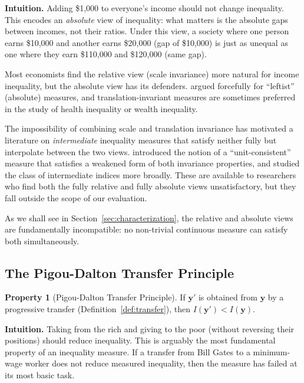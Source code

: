\documentclass[12pt]{article}
\theoremstyle{plain}
\theoremstyle{definition}
\newtheorem{axiom}{Property}
\theoremstyle{remark}
\newcommand{\bfy}{\mathbf{y}}
\begin{document}
\textbf{Intuition.}
Adding \$1{,}000 to everyone's income should not change inequality.
This encodes an \emph{absolute} view of inequality: what matters is the absolute gaps between incomes, not their ratios.
Under this view, a society where one person earns \$10{,}000 and another earns \$20{,}000 (gap of \$10{,}000) is just as unequal as one where they earn \$110{,}000 and \$120{,}000 (same gap).

Most economists find the relative view (scale invariance) more natural for income inequality, but the absolute view has its defenders.
\citet{Kolm1976a} argued forcefully for ``leftist'' (absolute) measures, and translation-invariant measures are sometimes preferred in the study of health inequality or wealth inequality.

The impossibility of combining scale and translation invariance has motivated a literature on \emph{intermediate} inequality measures that satisfy neither fully but interpolate between the two views.
\citet{Bossert1990} introduced the notion of a ``unit-consistent'' measure that satisfies a weakened form of both invariance properties, and \citet{Zheng1994} studied the class of intermediate indices more broadly.
These are available to researchers who find both the fully relative and fully absolute views unsatisfactory, but they fall outside the scope of our evaluation.

As we shall see in Section~\ref{sec:characterization}, the relative and absolute views are fundamentally incompatible: no non-trivial continuous measure can satisfy both simultaneously.

\subsection{The Pigou-Dalton Transfer Principle}\label{sec:transfer}

\begin{axiom}[Pigou-Dalton Transfer Principle]\label{ax:pd}
If $\bfy'$ is obtained from $\bfy$ by a progressive transfer (Definition~\ref{def:transfer}), then $I(\bfy') < I(\bfy)$.
\end{axiom}

\textbf{Intuition.}
Taking from the rich and giving to the poor (without reversing their positions) should reduce inequality.
This is arguably the most fundamental property of an inequality measure.
If a transfer from Bill Gates to a minimum-wage worker does not reduce measured inequality, then the measure has failed at its most basic task.
\end{document}
